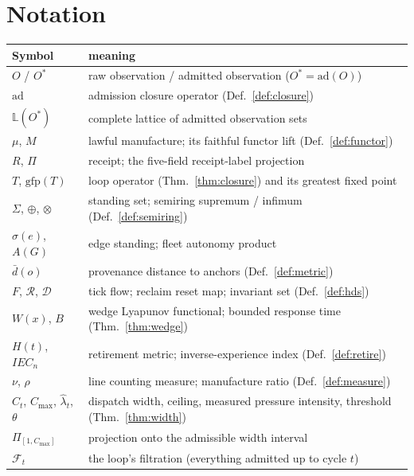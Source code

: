 \documentclass[11pt,a4paper]{article}
\theoremstyle{remark}
\newcommand{\Ostar}{$O^{*}$}
\begin{document}
\section{Notation}
\begin{longtable}{@{}p{2.6cm}p{12.6cm}@{}}
\toprule
Symbol & meaning \\
\midrule
$O$ / \Ostar{} & raw observation / admitted observation ($O^{*} = \mathrm{ad}(O)$) \\
$\mathrm{ad}$ & admission closure operator (Def.~\ref{def:closure}) \\
$\mathbb{L}(O^{*})$ & complete lattice of admitted observation sets \\
$\mu$, $M$ & lawful manufacture; its faithful functor lift (Def.~\ref{def:functor}) \\
$R$, $\Pi$ & receipt; the five-field receipt-label projection \\
$T$, $\mathrm{gfp}(T)$ & loop operator (Thm.~\ref{thm:closure}) and its greatest fixed point \\
$\Sigma$, $\oplus$, $\otimes$ & standing set; semiring supremum / infimum (Def.~\ref{def:semiring}) \\
$\sigma(e)$, $A(G)$ & edge standing; fleet autonomy product \\
$\bar{d}(o)$ & provenance distance to anchors (Def.~\ref{def:metric}) \\
$F$, $\mathcal{R}$, $\mathcal{D}$ & tick flow; reclaim reset map; invariant set (Def.~\ref{def:hds}) \\
$W(x)$, $B$ & wedge Lyapunov functional; bounded response time (Thm.~\ref{thm:wedge}) \\
$H(t)$, $IEC_n$ & retirement metric; inverse-experience index (Def.~\ref{def:retire}) \\
$\nu$, $\rho$ & line counting measure; manufacture ratio (Def.~\ref{def:measure}) \\
$C_t$, $C_{\max}$, $\hat{\lambda}_t$, $\theta$ & dispatch width, ceiling, measured pressure intensity, threshold (Thm.~\ref{thm:width}) \\
$\Pi_{[1,C_{\max}]}$ & projection onto the admissible width interval \\
$\mathcal{F}_t$ & the loop's filtration (everything admitted up to cycle $t$) \\
\bottomrule
\end{longtable}
\end{document}
